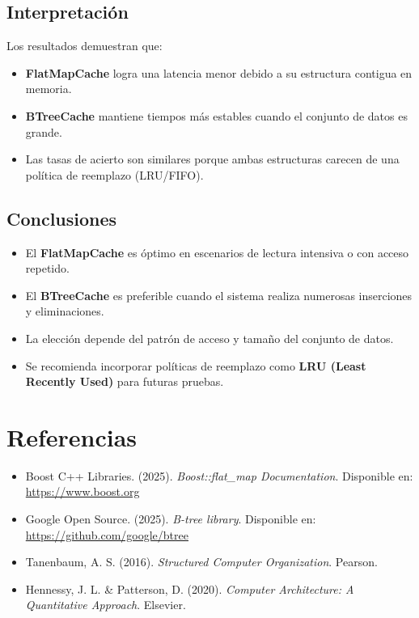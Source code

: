\documentclass[12pt,a4paper]{article}
\begin{document}
\subsection{Interpretación}

Los resultados demuestran que:
\begin{itemize}
    \item \textbf{FlatMapCache} logra una latencia menor debido a su estructura contigua en memoria.
    \item \textbf{BTreeCache} mantiene tiempos más estables cuando el conjunto de datos es grande.
    \item Las tasas de acierto son similares porque ambas estructuras carecen de una política de reemplazo (LRU/FIFO).
\end{itemize}

\subsection{Conclusiones}

\begin{itemize}
    \item El \textbf{FlatMapCache} es óptimo en escenarios de lectura intensiva o con acceso repetido.
    \item El \textbf{BTreeCache} es preferible cuando el sistema realiza numerosas inserciones y eliminaciones.
    \item La elección depende del patrón de acceso y tamaño del conjunto de datos.
    \item Se recomienda incorporar políticas de reemplazo como \textbf{LRU (Least Recently Used)} para futuras pruebas.
\end{itemize}

\section{Referencias}

\begin{itemize}
    \item Boost C++ Libraries. (2025). \textit{Boost::flat\_map Documentation}. Disponible en: \url{https://www.boost.org}
    \item Google Open Source. (2025). \textit{B-tree library}. Disponible en: \url{https://github.com/google/btree}
    \item Tanenbaum, A. S. (2016). \textit{Structured Computer Organization}. Pearson.
    \item Hennessy, J. L. \& Patterson, D. (2020). \textit{Computer Architecture: A Quantitative Approach}. Elsevier.
\end{itemize}
\end{document}
